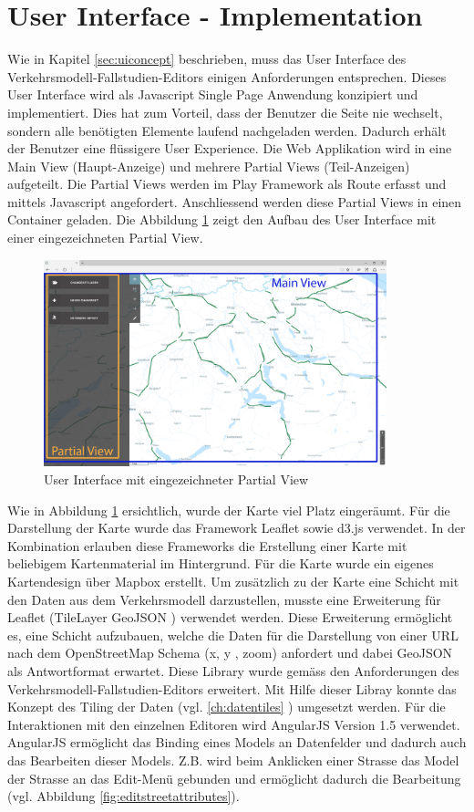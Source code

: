 \section{User Interface - Implementation}
Wie in Kapitel \ref{sec:uiconcept}  beschrieben, muss das User Interface des Verkehrsmodell-Fallstudien-Editors einigen Anforderungen entsprechen. Dieses User Interface wird als Javascript Single Page Anwendung konzipiert und implementiert. Dies hat zum Vorteil, dass der Benutzer die Seite nie wechselt, sondern alle benötigten Elemente laufend nachgeladen werden. Dadurch erhält der Benutzer eine flüssigere User Experience. Die Web Applikation wird in eine Main View (Haupt-Anzeige) und mehrere Partial Views (Teil-Anzeigen) aufgeteilt. Die Partial Views werden im Play Framework als Route erfasst und mittels Javascript angefordert. Anschliessend werden diese Partial Views in einen Container geladen. Die Abbildung \ref{fig:mainviewpartialview} zeigt den Aufbau des User Interface mit einer eingezeichneten Partial View.
\begin{figure}[H]
\centering
\includegraphics[height=6cm]{images/Mainviewpartialview.png}
\caption{User Interface mit eingezeichneter Partial View}
\label{fig:mainviewpartialview}
\end{figure}
\noindent
Wie in Abbildung \ref{fig:mainviewpartialview} ersichtlich, wurde der Karte viel Platz eingeräumt. Für die Darstellung der Karte wurde das Framework Leaflet \cite{Leaflet} sowie d3.js \cite{D3JS} verwendet. In der Kombination erlauben diese Frameworks die Erstellung einer Karte mit beliebigem Kartenmaterial im Hintergrund. Für die Karte wurde ein eigenes Kartendesign über Mapbox\cite{Mapbox} erstellt. Um zusätzlich zu der Karte eine Schicht mit den Daten aus dem Verkehrsmodell darzustellen, musste eine Erweiterung für Leaflet (TileLayer GeoJSON \cite{LeafletGeoJSON}) verwendet werden. Diese Erweiterung ermöglicht es, eine Schicht aufzubauen, welche die Daten für die Darstellung von einer URL nach dem OpenStreetMap Schema (x, y , zoom) anfordert und dabei GeoJSON als Antwortformat erwartet. Diese Library wurde gemäss den Anforderungen des Verkehrsmodell-Fallstudien-Editors erweitert. Mit Hilfe dieser Libray konnte das Konzept des Tiling der Daten (vgl. \ref{ch:datentiles} ) umgesetzt werden. Für die Interaktionen mit den einzelnen Editoren wird AngularJS \cite{AngularJS} Version 1.5 verwendet. AngularJS ermöglicht das Binding eines Models an Datenfelder und dadurch auch das Bearbeiten dieser Models. Z.B. wird beim Anklicken einer Strasse das Model der Strasse an das Edit-Menü gebunden und ermöglicht dadurch die Bearbeitung (vgl. Abbildung \ref{fig:editstreetattributes}).
